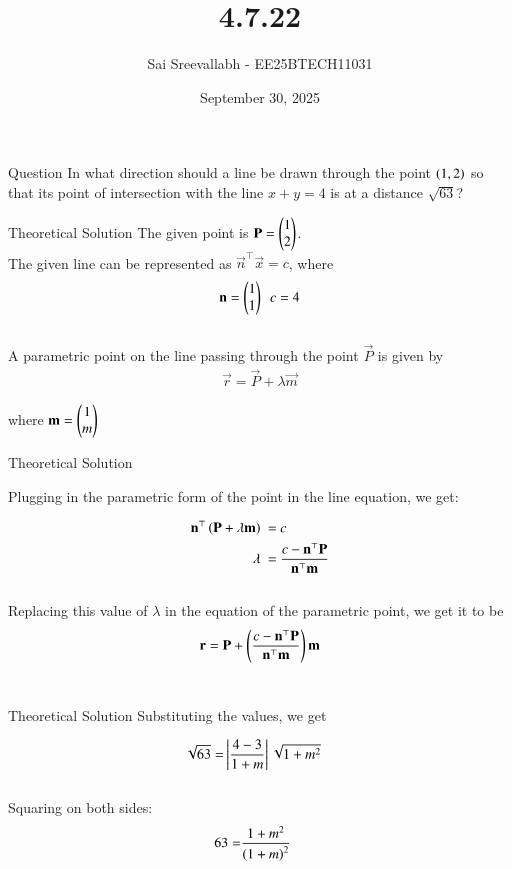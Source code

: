 \documentclass{beamer}
\title 
{4.7.22}
\date{September 30, 2025}
\author 
{Sai Sreevallabh - EE25BTECH11031}
\begin{document}
\frame{\titlepage}
\begin{frame}{Question}
In what direction should a line be drawn through the point $\left(1,2\right)$ so that its point of intersection with the line $x+y=4$ is at a distance $\sqrt{63}$?\\
\end{frame}



\begin{frame}{Theoretical Solution}
The given point is $\mathbf{P} = \begin{pmatrix}1\\2\end{pmatrix}$.\\

The given line can be represented as $\vec{n}^\top\vec{x} = c$, where 
\begin{align}
    \mathbf{n} = \begin{pmatrix}1\\1\end{pmatrix} \ \ c = 4
\end{align}\\

A parametric point on the line passing through the point $\vec{P}$ is given by 
\begin{align}
    \vec{r} = \vec{P} + \lambda\vec{m}
\end{align}

where $\mathbf{m} = \begin{pmatrix}1\\m\end{pmatrix}$\\

\end{frame}

\begin{frame}{Theoretical Solution}

Plugging in the parametric form of the point in the line equation, we get: 

\begin{align}
    \mathbf{n}^\top\left(\mathbf{P+\lambda\mathbf{m}}\right)\  =&\  c\\
    \lambda \ =&\  \frac{c-\mathbf{n}^\top\mathbf{P}}{\mathbf{n}^\top\mathbf{m}}
\end{align}\\

Replacing this value of $\lambda$ in the equation of the parametric point, we get it to be
\begin{align}
    \mathbf{r} = \mathbf{P} + \left(\frac{c-\mathbf{n}^\top\mathbf{P}}{\mathbf{n}^\top\mathbf{m}}\right)\mathbf{m}
\end{align}\\

\end{frame}

\begin{frame}{Theoretical Solution}
Substituting the values, we get

\begin{align}
    \sqrt{63} =& \left\vert\frac{4-3}{1+m}\right\vert\sqrt{1+m^2}
\end{align}\\

Squaring on both sides:
\begin{align}
    63 =& \frac{1+m^2}{\left(1+m\right)^2}
\end{align}
\end{frame}
\end{document}
